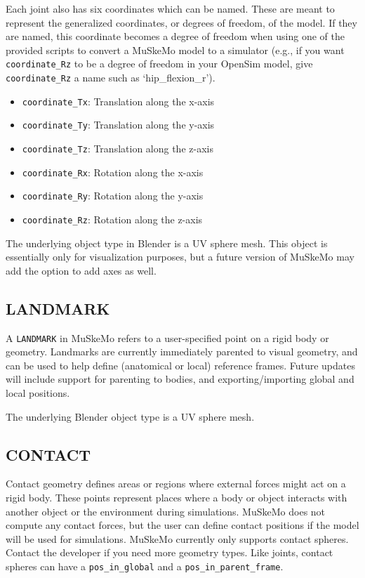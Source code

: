 \documentclass{article}
\begin{document}
Each joint also has six coordinates which can be named. These are meant to represent the generalized coordinates, or degrees of freedom, of the model. If they are named, this coordinate becomes a degree of freedom when using one of the provided scripts to convert a MuSkeMo model to a simulator (e.g., if you want \texttt{coordinate\_Rz} to be a degree of freedom in your OpenSim model, give \texttt{coordinate\_Rz} a name such as ‘hip\_flexion\_r’).

\begin{itemize}
    \item \texttt{coordinate\_Tx}: Translation along the x-axis
    \item \texttt{coordinate\_Ty}: Translation along the y-axis
    \item \texttt{coordinate\_Tz}: Translation along the z-axis
    \item \texttt{coordinate\_Rx}: Rotation along the x-axis
    \item \texttt{coordinate\_Ry}: Rotation along the y-axis
    \item \texttt{coordinate\_Rz}: Rotation along the z-axis
\end{itemize}

The underlying object type in Blender is a UV sphere mesh. This object is essentially only for visualization purposes, but a future version of MuSkeMo may add the option to add axes as well.

\subsection{LANDMARK}

A \texttt{LANDMARK} in MuSkeMo refers to a user-specified point on a rigid body or geometry. Landmarks are currently immediately parented to visual geometry, and can be used to help define (anatomical or local) reference frames. Future updates will include support for parenting to bodies, and exporting/importing global and local positions.

The underlying Blender object type is a UV sphere mesh.

\subsection{CONTACT}

Contact geometry defines areas or regions where external forces might act on a rigid body. These points represent places where a body or object interacts with another object or the environment during simulations. MuSkeMo does not compute any contact forces, but the user can define contact positions if the model will be used for simulations. MuSkeMo currently only supports contact spheres. Contact the developer if you need more geometry types. 
Like joints, contact spheres can have a \texttt{pos\_in\_global} and a \texttt{pos\_in\_parent\_frame}.
\end{document}
